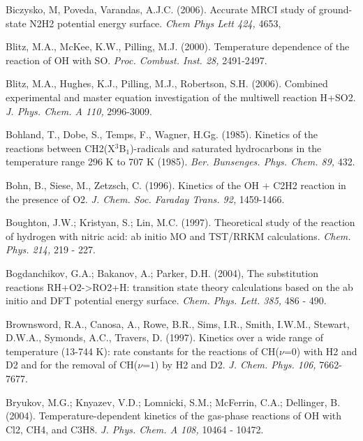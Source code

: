 \documentclass[12pt,landscape]{article}
\newcounter{reaction}
\begin{document}

Biczysko, M, Poveda, Varandas, A.J.C. (2006). Accurate MRCI study of ground-state N2H2 potential energy surface. {\em Chem Phys Lett 424,} 4653,

Blitz, M.A., McKee, K.W., Pilling, M.J. (2000). Temperature dependence of the reaction of OH with SO. {\em Proc. Combust. Inst. 28,} 2491-2497.

Blitz, M.A., Hughes, K.J., Pilling, M.J., Robertson, S.H. (2006).  Combined experimental and master equation investigation of the multiwell reaction H+SO2.  {\em J. Phys. Chem. A  110,} 2996-3009.

Bohland, T., Dobe, S., Temps, F., Wagner, H.Gg. (1985).  Kinetics of the reactions between CH2(X$^3$B$_1$)-radicals and saturated hydrocarbons in the temperature range 296 K to 707 K (1985). {\em Ber. Bunsenges. Phys. Chem. 89,} 432.

Bohn, B., Siese, M., Zetzsch, C. (1996). Kinetics of the OH + C2H2 reaction in the presence of O2. {\em J. Chem. Soc. Faraday Trans. 92,} 1459-1466.

  Boughton, J.W.; Kristyan, S.; Lin, M.C. (1997).  Theoretical study of the reaction of hydrogen with nitric acid: ab initio MO and TST/RRKM calculations. {\em Chem. Phys. 214,} 219 - 227.

Bogdanchikov, G.A.; Bakanov, A.; Parker, D.H. (2004), The substitution reactions RH+O2->RO2+H: transition state theory calculations based on the ab initio and DFT potential energy surface.  {\em Chem. Phys. Lett. 385,} 486 - 490.

Brownsword, R.A., Canosa, A., Rowe, B.R., Sims, I.R., Smith, I.W.M., Stewart, D.W.A., Symonds, A.C., Travers, D. (1997). Kinetics over a wide range of temperature (13-744 K): rate constants for the reactions of CH($\nu$=$0$) with H2 and D2 and for the removal of CH($\nu$=$1$) by H2 and D2. {\em J. Chem. Phys. 106,} 7662-7677.

Bryukov, M.G.; Knyazev, V.D.; Lomnicki, S.M.; McFerrin, C.A.; Dellinger, B. (2004).  Temperature-dependent kinetics of the gas-phase reactions of OH with Cl2, CH4, and C3H8. {\em J. Phys. Chem. A 108,} 10464 - 10472.
\end{document}
